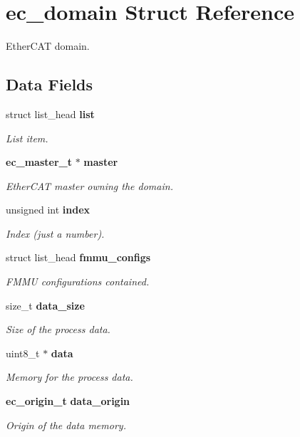 \section{ec\-\_\-domain Struct Reference}
\label{structec__domain}


Ether\-C\-A\-T domain.  


\subsection*{Data Fields}
\begin{DoxyCompactItemize}
\item 
struct list\-\_\-head {\bf list}
\begin{DoxyCompactList}\small\item\em List item. \end{DoxyCompactList}\item 
{\bf ec\-\_\-master\-\_\-t} $\ast$ {\bf master}
\begin{DoxyCompactList}\small\item\em Ether\-C\-A\-T master owning the domain. \end{DoxyCompactList}\item 
unsigned int {\bf index}
\begin{DoxyCompactList}\small\item\em Index (just a number). \end{DoxyCompactList}\item 
struct list\-\_\-head {\bf fmmu\-\_\-configs}
\begin{DoxyCompactList}\small\item\em F\-M\-M\-U configurations contained. \end{DoxyCompactList}\item 
size\-\_\-t {\bf data\-\_\-size}
\begin{DoxyCompactList}\small\item\em Size of the process data. \end{DoxyCompactList}\item 
uint8\-\_\-t $\ast$ {\bf data}
\begin{DoxyCompactList}\small\item\em Memory for the process data. \end{DoxyCompactList}\item 
{\bf ec\-\_\-origin\-\_\-t} {\bf data\-\_\-origin}
\begin{DoxyCompactList}\small\item\em Origin of the {\itshape data} memory. \end{DoxyCompactList}\item 

\end{DoxyCompactItemize}
